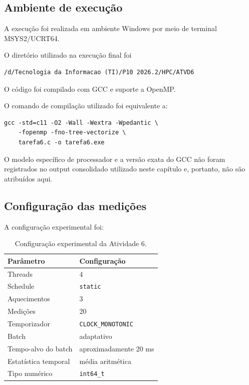 \label{sec:atvd06-metodologia}

\subsection{Ambiente de execução}

A execução foi realizada em ambiente Windows por meio de terminal
MSYS2/UCRT64.

O diretório utilizado na execução final foi

\begin{verbatim}
/d/Tecnologia da Informacao (TI)/P10 2026.2/HPC/ATVD6
\end{verbatim}

O código foi compilado com GCC e suporte a OpenMP.

O comando de compilação utilizado foi equivalente a:

\begin{verbatim}
gcc -std=c11 -O2 -Wall -Wextra -Wpedantic \
    -fopenmp -fno-tree-vectorize \
    tarefa6.c -o tarefa6.exe
\end{verbatim}

O modelo específico de processador e a versão exata do GCC não foram
registrados no output consolidado utilizado neste capítulo e, portanto, não
são atribuídos aqui.


\subsection{Configuração das medições}

A configuração experimental foi:

\begin{table}[htbp]
    \centering
    \caption{Configuração experimental da Atividade 6.}
    \label{tab:atvd06-config}

    \begin{tabular}{l|l}
        \hline
        Parâmetro & Configuração \\
        \hline
        Threads & 4 \\
        Schedule & \texttt{static} \\
        Aquecimentos & 3 \\
        Medições & 20 \\
        Temporizador & \texttt{CLOCK\_MONOTONIC} \\
        Batch & adaptativo \\
        Tempo-alvo do batch & aproximadamente 20 ms \\
        Estatística temporal & média aritmética \\
        Tipo numérico & \texttt{int64\_t} \\
        \hline
    \end{tabular}
\end{table}


